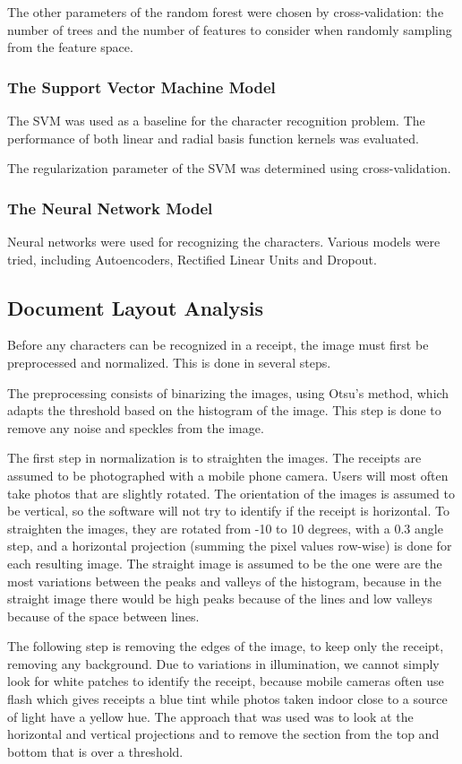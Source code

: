 The other parameters of the random forest were chosen by cross-validation: the number of trees and the number of features to consider when randomly sampling from the feature space. 

\subsubsection{The Support Vector Machine Model}
The SVM was used as a baseline for the character recognition problem. The performance of both linear and radial basis function kernels was evaluated. 

The regularization parameter of the SVM was determined using cross-validation. 

\subsubsection{The Neural Network Model}
Neural networks were used for recognizing the characters. Various models were tried, including Autoencoders, Rectified Linear Units and Dropout. 


\subsection{Document Layout Analysis}
Before any characters can be recognized in a receipt, the image must first be preprocessed and normalized. This is done in several steps. 

The preprocessing consists of binarizing the images, using Otsu's method\cite{otsu1975threshold}, which adapts the threshold based on the histogram of the image. This step is done to remove any noise and speckles from the image. 

The first step in normalization is to straighten the images. The receipts are assumed to be photographed with a mobile phone camera. Users will most often take photos that are slightly rotated. The orientation of the images is assumed to be vertical, so the software will not try to identify if the receipt is horizontal. To straighten the images, they are rotated from -10 to 10 degrees, with a 0.3 angle step, and a horizontal projection (summing the pixel values row-wise) is done for each resulting image. The straight image is assumed to be the one were are the most variations between the peaks and valleys of the histogram, because in the straight image there would be high peaks because of the lines and low valleys because of the space between lines. 

The following step is removing the edges of the image, to keep only the receipt, removing any background. Due to variations in illumination, we cannot simply look for white patches to identify the receipt, because mobile cameras often use flash which gives receipts a blue tint while photos taken indoor close to a source of light have a yellow hue. The approach that was used was to look at the horizontal and vertical projections and to remove the section from the top and bottom that is over a threshold. 

